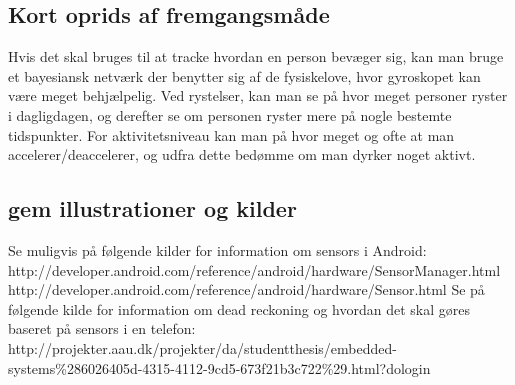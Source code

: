 \subsection{Kort oprids af fremgangsmåde} Hvis det skal bruges til at tracke hvordan en person bevæger sig, kan man bruge et bayesiansk netværk der benytter sig af de fysiskelove, hvor gyroskopet kan være meget behjælpelig. Ved rystelser, kan man se på hvor meget personer ryster i dagligdagen, og derefter se om personen ryster mere på nogle bestemte tidspunkter. For aktivitetsniveau kan man på hvor meget og ofte at man accelerer/deaccelerer, og udfra dette bedømme om man dyrker noget aktivt.

\subsection{gem illustrationer og kilder} 
Se muligvis på følgende kilder for information om sensors i Android: http://developer.android.com/reference/android/hardware/SensorManager.html http://developer.android.com/reference/android/hardware/Sensor.html 
Se på følgende kilde for information om dead reckoning og hvordan det skal gøres baseret på sensors i en telefon: http://projekter.aau.dk/projekter/da/studentthesis/embedded-systems\%286026405d-4315-4112-9cd5-673f21b3c722\%29.html?dologin 